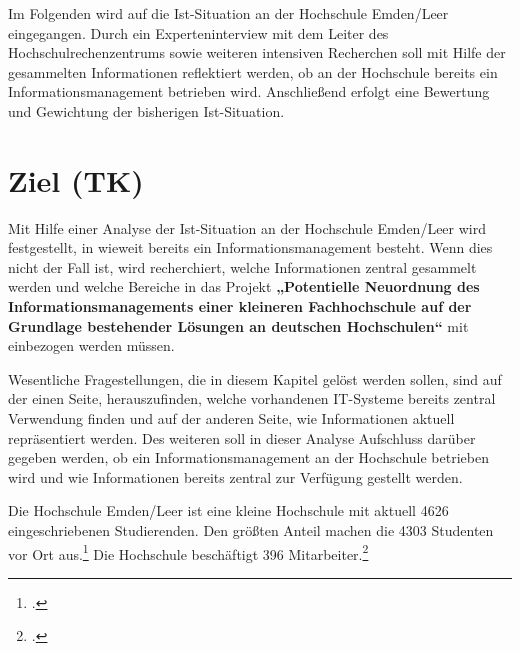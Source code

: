 Im Folgenden wird auf die Ist-Situation an der Hochschule Emden/Leer eingegangen. Durch ein 
Experteninterview mit dem Leiter des Hochschulrechenzentrums sowie weiteren intensiven Recherchen soll 
mit Hilfe der gesammelten Informationen reflektiert werden, ob an der Hochschule bereits ein 
Informationsmanagement betrieben wird. Anschließend erfolgt eine Bewertung und Gewichtung der 
bisherigen Ist-Situation.

\section{Ziel (TK)}
Mit Hilfe einer Analyse der Ist-Situation an der Hochschule Emden/Leer wird festgestellt, in wieweit bereits 
ein Informationsmanagement besteht. Wenn dies nicht der Fall ist, wird recherchiert, welche Informationen 
zentral gesammelt werden und welche Bereiche in das Projekt \textbf{„Potentielle Neuordnung des 
	Informationsmanagements einer kleineren Fachhochschule auf der Grundlage bestehender Lösungen an 
	deutschen Hochschulen“} mit einbezogen werden müssen.

Wesentliche Fragestellungen, die in diesem Kapitel gelöst werden sollen, sind auf der einen Seite, 
herauszufinden, welche vorhandenen IT-Systeme bereits zentral Verwendung finden und auf der anderen 
Seite, wie Informationen aktuell repräsentiert werden. Des weiteren soll in dieser Analyse Aufschluss darüber 
gegeben werden, ob ein Informationsmanagement an der Hochschule betrieben wird und wie Informationen 
bereits zentral zur Verfügung gestellt werden.

Die Hochschule Emden/Leer ist eine kleine Hochschule mit aktuell 4626 eingeschriebenen Studierenden. Den 
größten Anteil machen die 4303 Studenten vor Ort 
aus.\footcite{hsel_zeitreihe_2014} Die Hochschule beschäftigt 396 
Mitarbeiter.\footcite{hsel_zdf_2015}